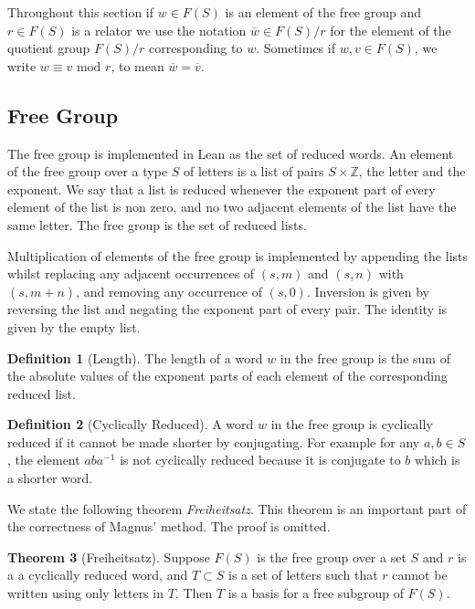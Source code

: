 \documentclass[12pt]{article} %
\theoremstyle{definition}
\newtheorem{theorem}{Theorem}[section]
\theoremstyle{definition}
\theoremstyle{definition}
\theoremstyle{definition}
\theoremstyle{definition}
\newtheorem{defn}[theorem]{Definition}
\theoremstyle{definition}
\begin{document}
Throughout this section if $w \in F(S)$ is an element of the free group and $r \in F(S)$
is a relator we use the notation $\overline{w} \in F(S) / r$ for the element of the quotient
group $F(S) / r$ corresponding to $w$. Sometimes if $w, v \in F(S)$,
we write $w \equiv v \text{ mod } r$, to mean $\overline{w} = \overline{v}$.

\subsection{Free Group}

The free group is implemented in Lean as the set of reduced words. An element of
the free group over a type $S$ of letters is a list of pairs $S \times \mathbb{Z}$,
the letter and the exponent. We say that a list is reduced whenever
the exponent part of every element of the list is non zero, and
no two adjacent elements of the list have the same letter. The free group is the set of
reduced lists.

Multiplication of elements of the free group is implemented by appending the lists
whilst replacing any adjacent occurrences of $(s, m)$ and $(s, n)$ with $(s, m + n)$, and removing
any occurrence of $(s, 0)$. Inversion is given by reversing the list and negating
the exponent part of every pair. The identity is given by the empty list.

\begin{defn}[Length]\label{length}
  The length of a word $w$ in the free group is the sum of the absolute values of the exponent
  parts of each element of the corresponding reduced list.
\end{defn}

\begin{defn}[Cyclically Reduced]\label{cycred}
  A word $w$ in the free group is cyclically reduced if it cannot be made shorter
  by conjugating. For example for any $a, b \in S$,
  the element $aba^{-1}$ is not cyclically reduced
  because it is conjugate to $b$ which is a shorter word.
\end{defn}

We state the following theorem \textit{Freiheitsatz}. This theorem is an important
part of the correctness of Magnus' method. The proof is omitted.

\begin{theorem}[Freiheitsatz]\label{freiheitsatz}
  Suppose $F(S)$ is the free group over a set $S$ and $r$ is a a cyclically reduced
  word, and $T \subset S$ is a set of letters such that $r$ cannot be written
  using only letters in $T$. Then $T$ is a basis for a free subgroup of $F(S)$.
  \cite{mccool_schupp_1973}
\end{theorem}
\end{document}

